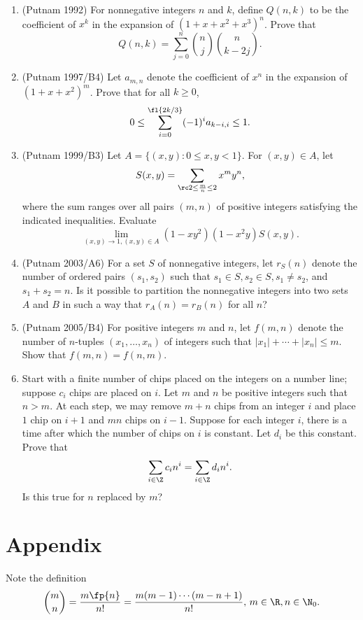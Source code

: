\begin{enumerate}
\item (Putnam 1992) For nonnegative integers $n$ and $k$, define $Q(n,k)$ to be the coefficient of $x^k$ in the expansion of $(1+x+x^2+x^3)^n$. Prove that
\[
Q(n,k)=\sum_{j=0}^n\binom nj \binom{n}{k-2j}.
\]
\item (Putnam 1997/B4) Let $a_{m,n}$ denote the coefficient of $x^n$ in the expansion of $(1+x+x^2)^m$. Prove that for all $k\ge 0$,
\[
0\le \sum_{i=0}^{\fl{2k/3}} (-1)^i a_{k-i,i}\le 1.
\]
\item (Putnam 1999/B3) Let $A=\{(x,y):0\le x,y< 1\}$. For $(x,y)\in A$, let
\[S(x,y)=\sum_{\rc 2\le \frac mn\le 2} x^my^n,\]
where the sum ranges over all pairs $(m,n)$ of positive integers satisfying the indicated inequalities. Evaluate
\[
\lim_{(x,y)\to 1,(x,y)\in A} (1-xy^2)(1-x^2y)S(x,y).
\]
\item (Putnam 2003/A6) For a set $S$ of nonnegative integers, let $r_S(n)$ denote the number of ordered pairs $(s_1,s_2)$ such that $s_1\in S,s_2\in S,s_1\ne s_2$, and $s_1+s_2=n$. Is it possible to partition the nonnegative integers into two sets $A$ and $B$ in such a way that $r_A(n)=r_B(n)$ for all $n$?
\item (Putnam 2005/B4) For positive integers $m$ and $n$, let $f(m,n)$ denote the number of $n$-tuples $(x_1,\ldots, x_n)$ of integers such that $|x_1|+\cdots +|x_n|\le m$. Show that $f(m,n)=f(n,m)$.
\item Start with a finite number of chips placed on the integers on a number line; suppose $c_i$ chips are placed on $i$. 
 Let $m$ and $n$ be positive integers such that $n>m$. 
At each step, we may remove $m+n$ chips from an integer $i$ and place $1$ chip on $i+1$ and $mn$ chips on $i-1$. Suppose for each integer $i$, there is a time after which the number of chips on $i$ is constant. Let $d_i$ be this constant.
Prove that
\[
\sum_{i\in \Z} c_i n^i=\sum_{i\in \Z}d_i n^i.
\]
Is this true for $n$ replaced by $m$?

\end{enumerate}
\section{Appendix}
Note the definition
\[
\binom mn=\frac{m\fp{n}}{n!}=\frac{m(m-1)\cdots (m-n+1)}{n!},\,m\in \R,n\in \N_0.
\]

